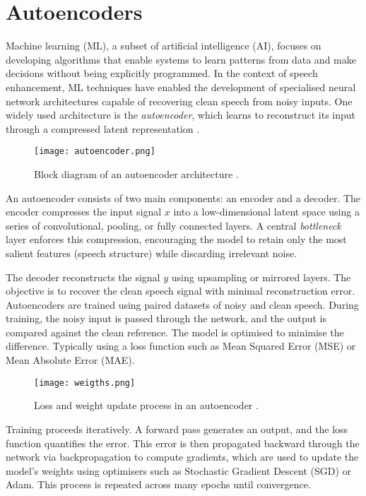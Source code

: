 \section{Autoencoders}
\label{sec:autoencoders}

Machine learning (ML), a subset of artificial intelligence (AI), focuses on developing algorithms that enable systems to learn patterns from data and make decisions without being explicitly programmed. In the context of speech enhancement, ML techniques have enabled the development of specialised neural network architectures capable of recovering clean speech from noisy inputs. One widely used architecture is the \textit{autoencoder}, which learns to reconstruct its input through a compressed latent representation \cite{azarang2020review}.

\begin{figure}[h]
    \centering
    \texttt{[image: autoencoder.png]}
    \caption{\label{fig:autoencoder} Block diagram of an autoencoder architecture \cite{vachhani2017dae}.}
\end{figure}

An autoencoder consists of two main components: an encoder and a decoder. The encoder compresses the input signal \(x\) into a low-dimensional latent space using a series of convolutional, pooling, or fully connected layers. A central \textit{bottleneck} layer enforces this compression, encouraging the model to retain only the most salient features (speech structure) while discarding irrelevant noise.

The decoder reconstructs the signal \(y\) using upsampling or mirrored layers. The objective is to recover the clean speech signal with minimal reconstruction error. Autoencoders are trained using paired datasets of noisy and clean speech. During training, the noisy input is passed through the network, and the output is compared against the clean reference. The model is optimised to minimise the difference. Typically using a loss function such as Mean Squared Error (MSE) or Mean Absolute Error (MAE).

\begin{figure}[h]
    \centering
    \texttt{[image: weigths.png]}
    \caption{\label{fig:weigths} Loss and weight update process in an autoencoder \cite{epoch2021}.}
\end{figure}

Training proceeds iteratively. A forward pass generates an output, and the loss function quantifies the error. This error is then propagated backward through the network via backpropagation to compute gradients, which are used to update the model’s weights using optimisers such as Stochastic Gradient Descent (SGD) or Adam. This process is repeated across many epochs until convergence.



